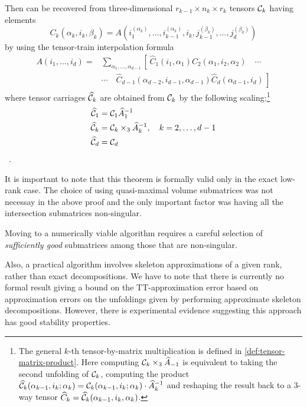 \begin{Teo}
  Then \A can be recovered from three-dimensional $r_{k-1} \times n_k \times r_k$ tensors $\mathcal{C}_k$ having elements
  \begin{equation*}
    C_k(\alpha_k,i_k,\beta_k) = A(i_1^{(\alpha_k)},\ldots,i_{k-1}^{(\alpha_k)},i_k,j_{k-1}^{(\beta_k)},\ldots,j_d^{(\beta_k)})
  \end{equation*}
  by using the tensor-train interpolation formula
  \begin{align*}
    A(i_1,\ldots,i_d) =& \sum_{\alpha_1,\ldots,\alpha_{d-1}} \left[ \, \hat{C}_1(i_1,\alpha_1) \hat{C}_2(\alpha_1,i_2,\alpha_2) \quad \cdots \right. \nonumber \\
    &\cdots \quad \left. \hat{C}_{d-1}(\alpha_{d-2},i_{d-1},\alpha_{d-1}) \hat{C}_d(\alpha_{d-1},i_d) \, \right]
  \end{align*}
  where tensor carriages $\widehat{\mathcal{C}}_k$ are obtained from $\mathcal{C}_k$ by the following scaling:\footnote{The general $k$-th tensor-by-matrix multiplication is defined in \ref{def:tensor-matrix-product}. Here computing $\mathcal{C}_k \times_3 \widehat{A}_{-1}$ is equivalent to taking the second unfolding of $\mathcal{C}_k$, computing the product $\widehat{\mathcal{C}}_k(\alpha_{k-1},i_k;\alpha_k) = \mathcal{C}_k(\alpha_{k-1},i_k;\alpha_k) \cdot \widehat{A}_k^{-1}$ and reshaping the result back to a 3-way tensor $\widehat{C}_k = \widehat{\mathcal{C}}_k(\alpha_{k-1},i_k,\alpha_k)$.}
  \begin{align*}
    \widehat{\mathcal{C}}_1 &= \mathcal{C}_1 \widehat{A}_1^{-1} \nonumber \\
    \widehat{\mathcal{C}}_k &= \mathcal{C}_k \times_3 \widehat{A}_k^{-1}, \quad k = 2, \ldots, d-1 \\
    \widehat{\mathcal{C}}_d &= \mathcal{C}_d \nonumber
  \end{align*}\, .
\end{Teo}

It is important to note that this theorem is formally valid only in the exact low-rank case. The choice of using quasi-maximal volume submatrices was not necessay in the above proof and the only important factor was having all the intersection submatrices non-singular.

Moving to a numerically viable algorithm requires a careful selection of \emph{sufficiently good} submatrices among those that are non-singular.

Also, a practical algorithm involves skeleton approximations of a given rank, rather than exact decompositions. We have to note that there is currently no formal result giving a bound on the TT-approximation error based on approximation errors on the unfoldings given by performing approximate skeleton decompositions. However, there is experimental evidence \cite{tt-cross} suggesting this approach has good stability properties.

